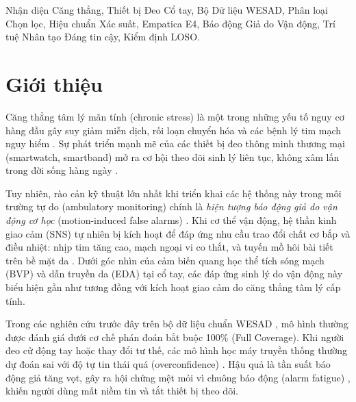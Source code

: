 \documentclass[conference]{IEEEtran}
\begin{document}
\begin{IEEEkeywords}
Nhận diện Căng thẳng, Thiết bị Đeo Cổ tay, Bộ Dữ liệu WESAD, Phân loại Chọn lọc, Hiệu chuẩn Xác suất, Empatica E4, Báo động Giả do Vận động, Trí tuệ Nhân tạo Đáng tin cậy, Kiểm định LOSO.
\end{IEEEkeywords}

\section{Giới thiệu}
Căng thẳng tâm lý mãn tính (chronic stress) là một trong những yếu tố nguy cơ hàng đầu gây suy giảm miễn dịch, rối loạn chuyển hóa và các bệnh lý tim mạch nguy hiểm \cite{cohen2007psychological, schneiderman2005stress, can2019stress}. Sự phát triển mạnh mẽ của các thiết bị đeo thông minh thương mại (smartwatch, smartband) mở ra cơ hội theo dõi sinh lý liên tục, không xâm lấn trong đời sống hàng ngày \cite{gjoreski2016continuous, schmidt2018wesad, sano2018multimodal}.

Tuy nhiên, rào cản kỹ thuật lớn nhất khi triển khai các hệ thống này trong môi trường tự do (ambulatory monitoring) chính là \textit{hiện tượng báo động giả do vận động cơ học} (motion-induced false alarms) \cite{schumm2008effect, tamura2014wearable, zhang2014troika}. Khi cơ thể vận động, hệ thần kinh giao cảm (SNS) tự nhiên bị kích hoạt để đáp ứng nhu cầu trao đổi chất cơ bắp và điều nhiệt: nhịp tim tăng cao, mạch ngoại vi co thắt, và tuyến mồ hôi bài tiết trên bề mặt da \cite{boucsein2012electrodermal}. Dưới góc nhìn của cảm biến quang học thể tích sóng mạch (BVP) và dẫn truyền da (EDA) tại cổ tay, các đáp ứng sinh lý do vận động này biểu hiện gần như tương đồng với kích hoạt giao cảm do căng thẳng tâm lý cấp tính.

Trong các nghiên cứu trước đây trên bộ dữ liệu chuẩn WESAD \cite{schmidt2018wesad, siirtola2019continuous, bobade2020stress, dalmeida2021hrv, behinaein2021transformer, bottcher2023detection}, mô hình thường được đánh giá dưới cơ chế phán đoán bắt buộc 100\% (Full Coverage). Khi người đeo cử động tay hoặc thay đổi tư thế, các mô hình học máy truyền thống thường dự đoán sai với độ tự tin thái quá (overconfidence) \cite{guo2017calibration}. Hậu quả là tần suất báo động giả tăng vọt, gây ra hội chứng mệt mỏi vì chuông báo động (alarm fatigue) \cite{sendelbach2013alarm}, khiến người dùng mất niềm tin và tắt thiết bị theo dõi.
\end{document}

